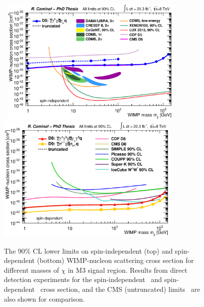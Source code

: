 



\begin{figure}[ht] 
   \centering
   \mbox{
     \includegraphics[width=0.795\textwidth]{Interpretations/Figures/WIMPnucleonXsection_spinIndependent.eps} 
   }
   \mbox{
     \includegraphics[width=0.795\textwidth]{Interpretations/Figures/WIMPnucleonXsection_spinDependent.eps} 
   }
\caption[90\% CL lower limits on spin-independent and spin-dependent the WIMP-nucleon scattering cross section.]{The 90\% CL lower limits on spin-independent (top) and spin-dependent (bottom) WIMP-nucleon scattering cross section for different masses of $\chi$ in M3 signal region. 
 Results from direct detection experiments for the spin-independent~\cite{Angloher:2011uu,Akerib:2013tjd,Agnese:2013rvf,Agnese:2014aze,Aalseth:2014jpa,Bernabei:2008yi,Bernabei:2010mq,Aprile:2012nq,Aprile:2013doa} and spin-dependent~\cite{Archambault:2012pm,Desai:2004pq,Abbasi:2009uz,Behnke:2010xt,Felizardo:2011uw} cross section, and the CMS (untruncated) limits~\cite{CMS:rwa} are also shown for comparison.}
\label{fig:WIMPsNucleonXSection}
\end{figure}

